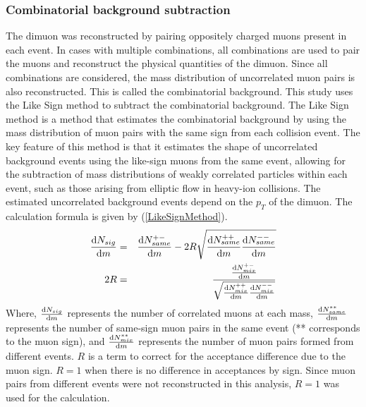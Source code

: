            \subsubsection{Combinatorial background subtraction}
            \label{Analysis:Dimuon:Combinatorial BG subtraction}
                The dimuon was reconstructed by pairing oppositely charged muons present in each event. In cases with multiple combinations, all combinations are used to pair the muons and reconstruct the physical quantities of the dimuon. Since all combinations are considered, the mass distribution of uncorrelated muon pairs is also reconstructed. This is called the combinatorial background. This study uses the Like Sign method to subtract the combinatorial background. The Like Sign method is a method that estimates the combinatorial background by using the mass distribution of muon pairs with the same sign from each collision event. The key feature of this method is that it estimates the shape of uncorrelated background events using the like-sign muons from the same event, allowing for the subtraction of mass distributions of weakly correlated particles within each event, such as those arising from elliptic flow in heavy-ion collisions. The estimated uncorrelated background events depend on the $p_T$ of the dimuon.
                The calculation formula is given by (\ref{LikeSignMethod}).
                \begin{eqnarray}
                    \label{LikeSignMethod}
                    \dv{N_{sig}}{m} &=& \dv{N_{same}^{+-}}{m} - 2R \sqrt{\dv{N_{same}^{++}}{m} \dv{N_{same}^{--}}{m}}\\
                    2R &=& \frac{\dv{N_{mix}^{+-}}{m}}{\sqrt{\dv{N_{mix}^{++}}{m} \dv{N_{mix}^{--}}{m}}} 
                \end{eqnarray}
                Where, $\dv{N_{sig}}{m}$ represents the number of correlated muons at each mass, $\dv{N_{same}^{**}}{m}$ represents the number of same-sign muon pairs in the same event (** corresponds to the muon sign), and $\dv{N_{mix}^{**}}{m}$ represents the number of muon pairs formed from different events. $R$ is a term to correct for the acceptance difference due to the muon sign. $R = 1$ when there is no difference in acceptances by sign. Since muon pairs from different events were not reconstructed in this analysis, $R = 1$ was used for the calculation.

